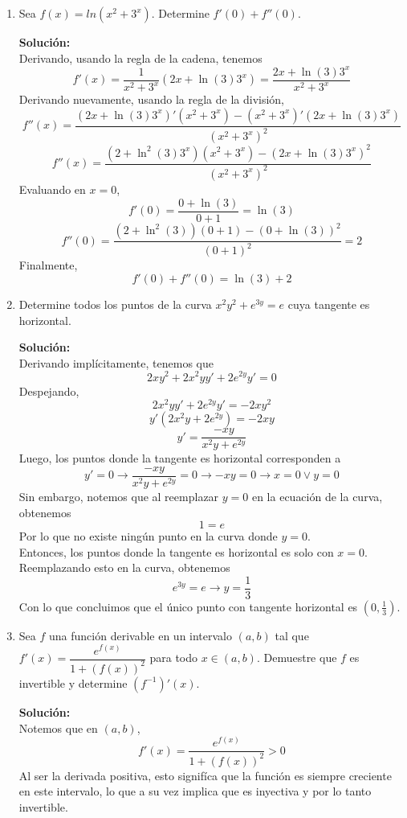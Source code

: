 \documentclass[12pt]{article}
\newenvironment{solucion}
{\begin{mdframed}[backgroundcolor=black!10]
		{\bf Solución:}\\
	}
	{
	\end{mdframed}
}
\newenvironment{preguntas}
{\begin{enumerate}\itemsep12pt
	}
	{
	\end{enumerate}
}
\newcommand{\ra}{\rightarrow}
\begin{document}
\begin{preguntas}
\item Sea $f(x) = ln(x^2+3^x)$. Determine $f'(0) + f''(0)$.
\begin{solucion}
Derivando, usando la regla de la cadena, tenemos
$$f'(x) = \dfrac{1}{x^2+3^x}(2x + \ln(3)3^x) = \dfrac{2x + \ln(3)3^x}{x^2+3^x}$$
Derivando nuevamente, usando la regla de la división,
$$f''(x) = \dfrac{(2x + \ln(3)3^x)'(x^2+3^x) - (x^2+3^x)'(2x + \ln(3)3^x)}{(x^2+3^x)^2}$$
$$f''(x) = \dfrac{(2 + \ln^2(3)3^x)(x^2+3^x) - (2x + \ln(3)3^x)^2}{(x^2+3^x)^2}$$
Evaluando en $x=0$,
$$f'(0) = \dfrac{0 + \ln(3)}{0+1} = \ln(3)$$
$$f''(0) = \dfrac{(2+\ln^2(3))(0+1) - (0+\ln(3))^2}{(0+1)^2} = 2$$
Finalmente,
$$f'(0) + f''(0) = \ln(3) + 2$$
\end{solucion}
\item Determine todos los puntos de la curva $x^2y^2 + e^{3y} = e$ cuya tangente es horizontal.
\begin{solucion}
Derivando implícitamente, tenemos que
$$2xy^2 + 2x^2yy' + 2e^{2y}y' = 0$$
Despejando,
$$2x^2yy' + 2e^{2y}y' = -2xy^2$$
$$y'(2x^2y + 2e^{2y}) = -2xy$$
$$y' = \dfrac{-xy}{x^2y + e^{2y}}$$
Luego, los puntos donde la tangente es horizontal corresponden a
$$y'= 0 \ra \dfrac{-xy}{x^2y + e^{2y}} = 0 \ra -xy = 0 \ra x = 0 \vee y = 0$$
Sin embargo, notemos que al reemplazar $y=0$ en la ecuación de la curva, obtenemos
$$1 = e$$
Por lo que no existe ningún punto en la curva donde $y=0$.\\

Entonces, los puntos donde la tangente es horizontal es solo con $x=0$. Reemplazando esto en la curva, obtenemos
$$e^{3y} = e \ra y = \dfrac{1}{3}$$
Con lo que concluimos que el único punto con tangente horizontal es $(0,\frac{1}{3})$.
\end{solucion}
\item Sea $f$ una función derivable en un intervalo $(a,b)$ tal que $f'(x) = \dfrac{e^{f(x)}}{1+(f(x))^2}$ para todo $x \in (a,b)$. Demuestre que $f$ es invertible y determine $(f^{-1})'(x)$.
\begin{solucion}
Notemos que en $(a,b)$,
$$f'(x) = \dfrac{e^{f(x)}}{1+(f(x))^2} > 0$$
Al ser la derivada positiva, esto signifíca que la función es siempre creciente en este intervalo, lo que a su vez implica que es inyectiva y por lo tanto invertible.\\


\end{solucion}
\end{preguntas}
\end{document}
